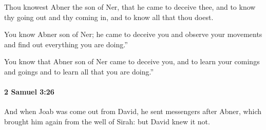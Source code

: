 			\begin{versebox}
					\item[BHS] 
					\item[ASV] Thou knowest Abner the son of Ner, that he came to deceive thee, and to know thy going out and thy coming in, and to know all that thou doest.
					\item[NIV] You know Abner son of Ner; he came to deceive you and observe your movements and find out everything you are doing.”
					\item[NRSV] You know that Abner son of Ner came to deceive you, and to learn your comings and goings and to learn all that you are doing.”
			\end{versebox}

		\paragraph{2 Samuel 3:26} %
			\label{2SAMUEL-3-26}

			And when Joab was come out from David, he sent messengers after Abner, which brought him again from the well of Sirah: but David knew it not.

